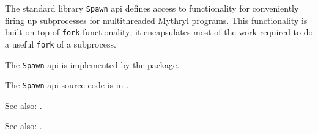
The standard library {\tt Spawn} api defines access to functionality for conveniently 
firing up subprocesses for multithreaded Mythryl programs.  This functionality is built on top of  
 {\tt fork} functionality;  it encapsulates most of the 
work required to do a useful {\tt fork} of a subprocess.

The {\tt Spawn} api is implemented by the  package.

The {\tt Spawn} api source code is in .


See also:  .

See also:  .
